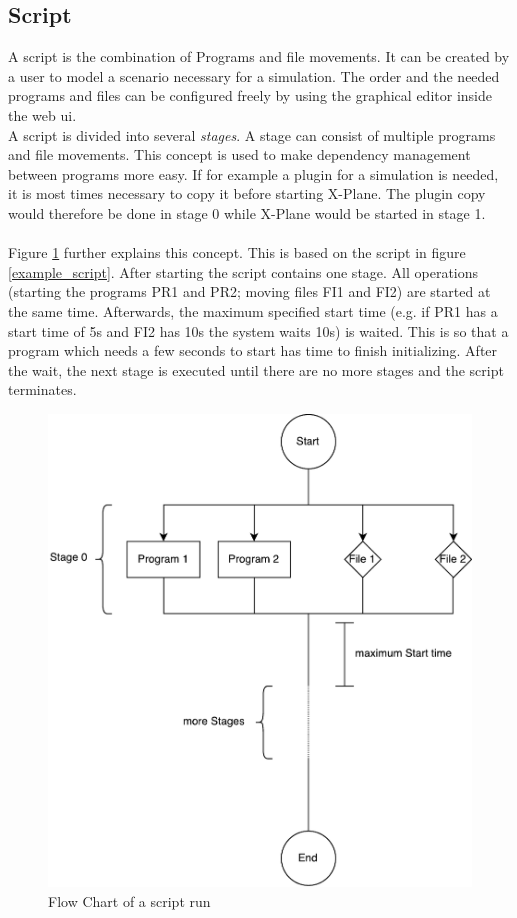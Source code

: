 \documentclass[accentcolor=tud1a, paper=a4, colorback]{tudreport}
\newcommand{\ind}[1]{#1\index{#1}}
\begin{document}
	\subsection{\ind{Script}}\label{script}
	A script is the combination of Programs and file movements. It can be created by a user to model
	a scenario necessary for a simulation. The order and the needed programs and files can be configured
	freely by using the graphical editor inside the web ui.
	\\
	A script is divided into several \textit{\ind{stages}}. A stage can consist of multiple programs
	and file movements. This concept is used to make dependency management between programs more easy.
	If for example a plugin for a simulation is needed, it is most times necessary to copy it before starting
	X-Plane. The plugin copy would therefore be done in stage 0 while X-Plane would be started in stage 1.
	\\\\
	Figure \ref{schedule} further explains this concept. This is based on the script in figure \ref{example_script}.
	After starting the script contains one stage. All operations (starting the programs PR1 and PR2; moving files FI1 and FI2)
	are started at the same time. Afterwards, the maximum specified start time (e.g. if PR1 has a start time of 5s and FI2 has
	10s the system waits 10s) is waited. This is so that a program which
	needs a few seconds to start has time to finish initializing. After the wait, the next stage is executed until
	there are no more stages and the script terminates.

	\begin{figure}[H]
		\centering
		\label{schedule}
		\includegraphics[width=.7\textwidth]{schedule}
		\caption{Flow Chart of a script run}
	\end{figure}
\end{document}
